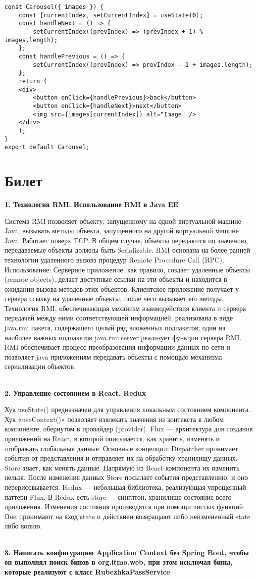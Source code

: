 \documentclass{article}
\newcommand{\bil}[5]{%
        \section{Билет}
        \textbf{1. #1}

        #4
        \\
        \textbf{2. #2}
        
        #5
        \\
        \textbf{3. #3}
}
\begin{document}
\begin{lstlisting}[frame=single, basicstyle=\ttfamily, breaklines=true, breakatwhitespace=true, postbreak=\mbox{\textcolor{red}{$\hookrightarrow$}\space}]
const Carousel({ images }) {
    const [currentIndex, setCurrentIndex] = useState(0);
    const handleNext = () => {
        setCurrentIndex((prevIndex) => (prevIndex + 1) % images.length);
    };
    const handlePrevious = () => {
        setCurrentIndex((prevIndex) => prevIndex - 1 + images.length);
    };
    return (
    <div>
        <button onClick={handlePrevious}>back</button>
        <button onClick={handleNext}>next</button>
        <img src={images[currentIndex]} alt="Image" />
    </div>
    );
}
export default Carousel;
\end{lstlisting}

\bil{Технология RMI. Использование RMI в Java EE}
{Управление состоянием в React. Redux}
{Написать конфигурацию Application Context  без Spring  Boot, чтобы он выполнял поиск бинов в  org.itmo.web, при этом исключая бины, которые реализуют с класс RubezhkaPassService}{
    Система RMI позволяет объекту, запущенному на одной виртуальной машине Java, вызывать методы объекта, 
    запущенного на другой виртуальной машине Java. Работает поверх TCP. В общем случае, объекты передаются 
    по значению, передаваемые объекты должны быть Serializable. RMI основана на более ранней технологии 
    удаленного вызова процедур Remote Procedure Call (RPC). Использование: Серверное приложение, как правило, 
    создает удаленные объекты (remote objects), делает доступные ссылки на эти объекты и находится в ожидании 
    вызова методов этих объектов. Клиентское приложение получает у сервера ссылку на удаленные объекты, после 
    чего вызывает его методы. Технология RMI, обеспечивающая механизм взаимодействия клиента и сервера передачей 
    между ними соответствующей информацией, реализована в виде java.rmi пакета, содержащего целый ряд вложенных 
    подпакетов; один из наиболее важных подпакетов java.rmi.server реализует функции сервера RMI. RMI обеспечивает 
    процесс преобразования информации данных по сети и позволяет java приложениям передавать объекты с помощью 
    механизма сериализации объектов.
}{
    Хук useState() предназначен для управления локальным состоянием компонента. 
    Хук «useContext()» позволяет извлекать значения из контекста в любом компоненте, 
    обернутом в провайдер (provider). Flux — архитектура для создания приложений на React, 
    в которой описывается, как хранить, изменять и отображать глобальные данные. 
    Основные концепции: Dispatcher принимает события от представления и отправляет их на обработку хранилищу данных. 
    Store знает, как менять данные. Напрямую из React-компонента их изменить нельзя. 
    После изменения данных Store посылает события представлению, и оно перерисовывается. 
    Redux — небольшая библиотека, реализующая упрощенный паттерн Flux. 
    В Redux есть store — синглтон, хранилище состояние всего приложения. 
    Изменения состояния производятся при помощи чистых функций. 
    Они принимают на вход state и действиеи возвращают либо неизмененный state либо копию.
}
\end{document}
